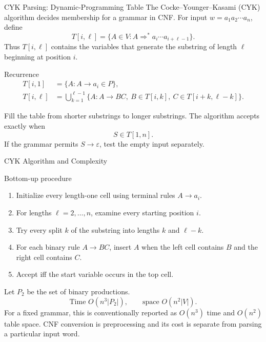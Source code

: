 \documentclass[10pt]{beamer}
\begin{document}
\begin{frame}{CYK Parsing: Dynamic-Programming Table}
  \small
  The Cocke--Younger--Kasami (CYK) algorithm decides membership for a grammar
  in CNF. For input $w=a_1a_2\cdots a_n$, define
  \[
    T[i,\ell]
    =\{A\in V:A\Rightarrow^*a_i\cdots a_{i+\ell-1}\}.
  \]
  Thus $T[i,\ell]$ contains the variables that generate the substring of
  length $\ell$ beginning at position $i$.
  \pause
  \begin{block}{Recurrence}
    \begin{align*}
      T[i,1]
        &=\{A:A\to a_i\in P\},\\
      T[i,\ell]
        &=\bigcup_{k=1}^{\ell-1}
          \{A:A\to BC,\ B\in T[i,k],\
          C\in T[i+k,\ell-k]\}.
    \end{align*}
  \end{block}
  Fill the table from shorter substrings to longer substrings. The algorithm
  accepts exactly when
  \[
    S\in T[1,n].
  \]
  If the grammar permits $S\to\varepsilon$, test the empty input separately.
\end{frame}

\begin{frame}{CYK Algorithm and Complexity}
  \small
  \begin{block}{Bottom-up procedure}
    \begin{enumerate}
      \item Initialize every length-one cell using terminal rules $A\to a_i$.
      \item For lengths $\ell=2,\ldots,n$, examine every starting position $i$.
      \item Try every split $k$ of the substring into lengths $k$ and
        $\ell-k$.
      \item For each binary rule $A\to BC$, insert $A$ when the left cell
        contains $B$ and the right cell contains $C$.
      \item Accept iff the start variable occurs in the top cell.
    \end{enumerate}
  \end{block}
  \pause
  Let $P_2$ be the set of binary productions.
  \[
    \boxed{\text{Time }O(n^3|P_2|),\qquad
           \text{space }O(n^2|V|).}
  \]
  For a fixed grammar, this is conventionally reported as $O(n^3)$ time and
  $O(n^2)$ table space. CNF conversion is preprocessing and its cost is
  separate from parsing a particular input word.
\end{frame}
\end{document}
